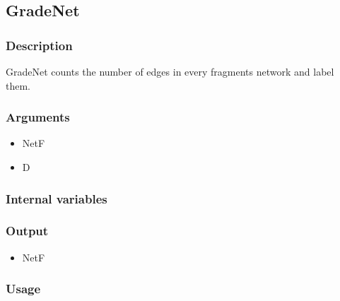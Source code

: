 \subsection{GradeNet}\label{GradeNet}
\subsubsection{Description}
GradeNet counts the number of edges in every fragments network and label them.
\subsubsection{Arguments}
\begin{itemize}
\item NetF
\item D
\end{itemize}
\subsubsection{Internal variables}
\subsubsection{Output}
\begin{itemize}
\item NetF
\end{itemize}
\subsubsection{Usage}

